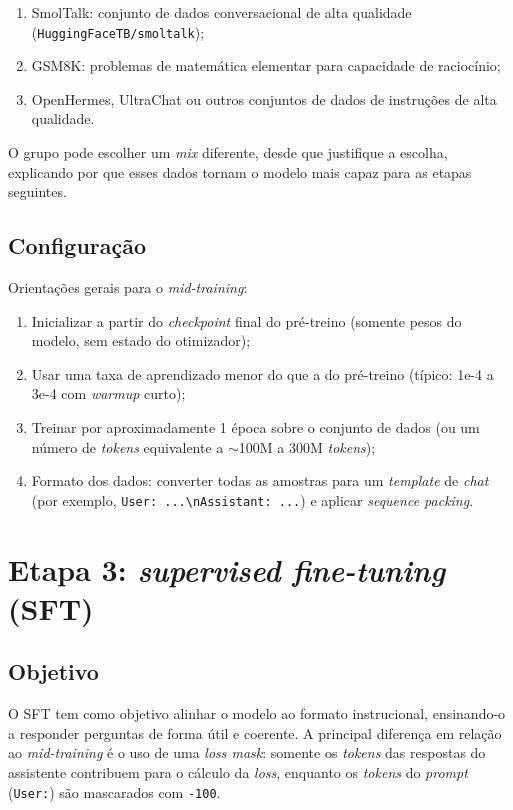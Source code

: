\documentclass{dlproblemset}
\begin{document}
\begin{enumerate}[1)]
    \item SmolTalk: conjunto de dados conversacional de alta qualidade (\texttt{HuggingFaceTB/smoltalk});
    \item GSM8K: problemas de matemática elementar para capacidade de raciocínio;
    \item OpenHermes, UltraChat ou outros conjuntos de dados de instruções de alta qualidade.
\end{enumerate}

O grupo pode escolher um \textit{mix} diferente, desde que justifique a escolha, explicando por que esses dados tornam o modelo mais capaz para as etapas seguintes.

\subsection*{Configuração}

Orientações gerais para o \textit{mid-training}:

\begin{enumerate}[1)]
    \item Inicializar a partir do \textit{checkpoint} final do pré-treino (somente pesos do modelo, sem estado do otimizador);
    \item Usar uma taxa de aprendizado menor do que a do pré-treino (típico: 1e-4 a 3e-4 com \textit{warmup} curto);
    \item Treinar por aproximadamente 1 época sobre o conjunto de dados (ou um número de \textit{tokens} equivalente a $\sim$100M a 300M \textit{tokens});
    \item Formato dos dados: converter todas as amostras para um \textit{template} de \textit{chat} (por exemplo, \texttt{User: ...\textbackslash nAssistant: ...}) e aplicar \textit{sequence packing}.
\end{enumerate}

\section*{Etapa 3: \textit{supervised fine-tuning} (SFT)}

\subsection*{Objetivo}

O SFT tem como objetivo alinhar o modelo ao formato instrucional, ensinando-o a responder perguntas de forma útil e coerente. A principal diferença em relação ao \textit{mid-training} é o uso de uma \textit{loss mask}: somente os \textit{tokens} das respostas do assistente contribuem para o cálculo da \textit{loss}, enquanto os \textit{tokens} do \textit{prompt} (\texttt{User:}) são mascarados com \texttt{-100}.
\end{document}
